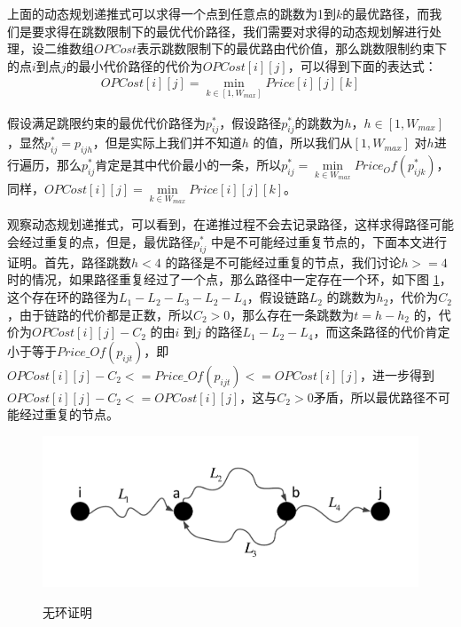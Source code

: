 上面的动态规划递推式可以求得一个点到任意点的跳数为1到$k$的最优路径，而我们是要求得在跳数限制下的最优代价路径，我们需要对求得的动态规划解进行处理，设二维数组$OPCost$表示跳数限制下的最优路由代价值，那么跳数限制约束下的点$i$到点$j$的最小代价路径的代价为$OPCost[i][j]$，可以得到下面的表达式：
\begin{equation}\label{best}
\begin{split}
OPCost[i][j]=\min\limits_{k \in [1,W_{max}]}{Price[i][j][k]}
\end{split}
\end{equation}

假设满足跳限约束的最优代价路径为$p_{ij}^*$，假设路径$p_{ij}^*$的跳数为$h$，$h \in [1,W_{max}]$，显然$p_{ij}^*=p_{ijh}$，但是实际上我们并不知道$h$ 的值，所以我们从$[1,W_{max}]$ 对$h$进行遍历，那么$p_{ij}^*$肯定是其中代价最小的一条，所以$p_{ij}^*=\min\limits_{k \in W_{max}}{Price_Of(p_{ijk}^*)}$，同样，$OPCost[i][j]=\min\limits_{k \in W_{max}}{Price[i][j][k]}$。

观察动态规划递推式，可以看到，在递推过程不会去记录路径，这样求得路径可能会经过重复的点，但是，最优路径$p_{ij}^*$ 中是不可能经过重复节点的，下面本文进行证明。首先，路径跳数$h<4$ 的路径是不可能经过重复的节点，我们讨论$h>=4$时的情况，如果路径重复经过了一个点，那么路径中一定存在一个环，如下图 \ref{prof}，这个存在环的路径为$L_1-L_2-L_3-L_2-L_4$，假设链路$L_2$ 的跳数为$h_2$，代价为$C_2$，由于链路的代价都是正数，所以$C_2>0$，那么存在一条跳数为$t=h-h_2$ 的，代价为$OPCost[i][j]-C_2$ 的由$i$ 到$j$ 的路径$L_1-L_2-L_4$，而这条路径的代价肯定小于等于$Price\_Of(p_{ijt})$，即$OPCost[i][j]-C_2<=Price\_Of(p_{ijt})<=OPCost[i][j]$，进一步得到$OPCost[i][j]-C_2<=OPCost[i][j]$，这与$C_2>0$矛盾，所以最优路径不可能经过重复的节点。
\begin{figure}
\setlength{\belowcaptionskip}{-0.5cm}
\begin{center}
{\includegraphics[width=1 \textwidth]{figures/circle.pdf}}
\end{center}
\caption{{\footnotesize{无环证明}}}
\label{prof}
\end{figure}
